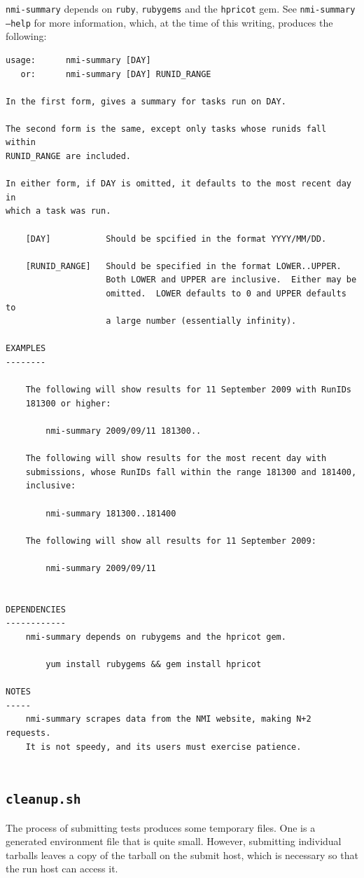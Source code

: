 {\tt nmi-summary} depends on {\tt ruby}, {\tt rubygems} and the {\tt hpricot}
gem.  See {\tt nmi-summary --help} for more information, which, at the time of
this writing, produces the following:

\begin{verbatim}
usage:      nmi-summary [DAY]
   or:      nmi-summary [DAY] RUNID_RANGE

In the first form, gives a summary for tasks run on DAY.

The second form is the same, except only tasks whose runids fall within
RUNID_RANGE are included.

In either form, if DAY is omitted, it defaults to the most recent day in
which a task was run.

    [DAY]           Should be spcified in the format YYYY/MM/DD.

    [RUNID_RANGE]   Should be specified in the format LOWER..UPPER.
                    Both LOWER and UPPER are inclusive.  Either may be
                    omitted.  LOWER defaults to 0 and UPPER defaults to
                    a large number (essentially infinity).

EXAMPLES
--------

    The following will show results for 11 September 2009 with RunIDs
    181300 or higher:

        nmi-summary 2009/09/11 181300..

    The following will show results for the most recent day with
    submissions, whose RunIDs fall within the range 181300 and 181400,
    inclusive:

        nmi-summary 181300..181400

    The following will show all results for 11 September 2009:

        nmi-summary 2009/09/11


DEPENDENCIES
------------
    nmi-summary depends on rubygems and the hpricot gem.

        yum install rubygems && gem install hpricot

NOTES
-----
    nmi-summary scrapes data from the NMI website, making N+2 requests.
    It is not speedy, and its users must exercise patience.
    
\end{verbatim}


\subsection{{\tt cleanup.sh}}
The process of submitting tests produces some temporary files.  One is a
generated environment file that is quite small.  However, submitting individual
tarballs leaves a copy of the tarball on the submit host, which is necessary so
that the run host can access it.


